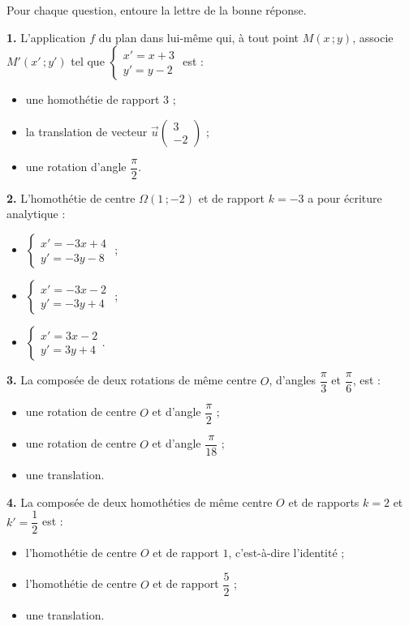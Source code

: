 \documentclass[11pt]{article}
\begin{document}
\begin{exercice}
Pour chaque question, entoure la lettre de la bonne réponse.

\textbf{1.} L'application $f$ du plan dans lui-même qui, à tout point $M(x\,;y)$, associe $M'(x'\,;y')$ tel que $\begin{cases} x' = x + 3 \\ y' = y - 2 \end{cases}$ est :
\begin{itemize}
\item[a)] une homothétie de rapport $3$ ;
\item[b)] la translation de vecteur $\vec{u}\begin{pmatrix} 3 \\ -2 \end{pmatrix}$ ;
\item[c)] une rotation d'angle $\dfrac{\pi}{2}$.
\end{itemize}

\textbf{2.} L'homothétie de centre $\Omega(1\,;-2)$ et de rapport $k = -3$ a pour écriture analytique :
\begin{itemize}
\item[a)] $\begin{cases} x' = -3x + 4 \\ y' = -3y - 8 \end{cases}$ ;
\item[b)] $\begin{cases} x' = -3x - 2 \\ y' = -3y + 4 \end{cases}$ ;
\item[c)] $\begin{cases} x' = 3x - 2 \\ y' = 3y + 4 \end{cases}$.
\end{itemize}

\textbf{3.} La composée de deux rotations de même centre $O$, d'angles $\dfrac{\pi}{3}$ et $\dfrac{\pi}{6}$, est :
\begin{itemize}
\item[a)] une rotation de centre $O$ et d'angle $\dfrac{\pi}{2}$ ;
\item[b)] une rotation de centre $O$ et d'angle $\dfrac{\pi}{18}$ ;
\item[c)] une translation.
\end{itemize}

\textbf{4.} La composée de deux homothéties de même centre $O$ et de rapports $k = 2$ et $k' = \dfrac{1}{2}$ est :
\begin{itemize}
\item[a)] l'homothétie de centre $O$ et de rapport $1$, c'est-à-dire l'identité ;
\item[b)] l'homothétie de centre $O$ et de rapport $\dfrac{5}{2}$ ;
\item[c)] une translation.
\end{itemize}
\end{exercice}
\end{document}
